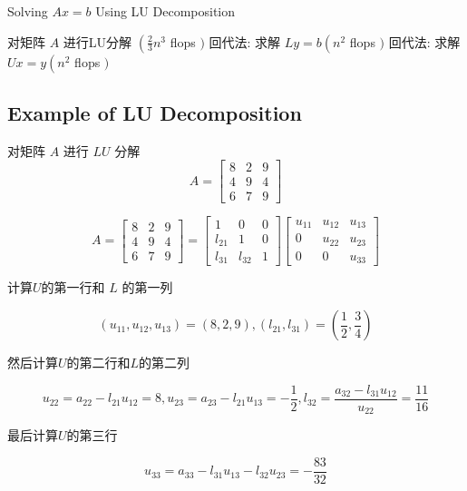 \begin{algorithm}
    \caption{Solving $Ax = b$ Using LU Decomposition}
    对矩阵 $ A $ 进行LU分解 $ \left(\frac{2}{3} n^{3}\right. $ flops $ ) $\;
    回代法: 求解 $ L y=b\left(n^{2}\right. $ flops $ ) $\;
    回代法: 求解 $ U x=y\left(n^{2}\right. $ flops $ ) $\;
\end{algorithm}


\subsection{Example of LU Decomposition}

\begin{example}
    对矩阵 $ A $ 进行 $ L U $ 分解
    \begin{equation}
        A=\left[\begin{array}{lll}
                8 & 2 & 9 \\
                4 & 9 & 4 \\
                6 & 7 & 9
            \end{array}\right]
    \end{equation}


    \begin{equation} A=\left[\begin{array}{lll}8 & 2 & 9 \\ 4 & 9 & 4 \\ 6 & 7 & 9\end{array}\right]=\left[\begin{array}{ccc}1 & 0 & 0 \\ l_{21} & 1 & 0 \\ l_{31} & l_{32} & 1\end{array}\right]\left[\begin{array}{ccc}u_{11} & u_{12} & u_{13} \\ 0 & u_{22} & u_{23} \\ 0 & 0 & u_{33}\end{array}\right] \end{equation}

    计算$U$的第一行和 $ L $ 的第一列

    \begin{equation} \left(u_{11}, u_{12}, u_{13}\right)=(8,2,9) , \left(l_{21}, l_{31}\right)=\left(\frac{1}{2}, \frac{3}{4}\right) \end{equation}

    然后计算$U$的第二行和$L$的第二列

    \begin{equation} u_{22}=a_{22}-l_{21} u_{12}=8 ,
        u_{23}=a_{23}-l_{21} u_{13}=-\frac{1}{2} , l_{32}=\frac{a_{32}-l_{31} u_{12}}{u_{22}}=\frac{11}{16} \end{equation}


    最后计算$U$的第三行

    \begin{equation} u_{33}=a_{33}-l_{31}  u_{13}-l_{32} u_{23}=-\frac{83}{32} \end{equation}

\end{example}


